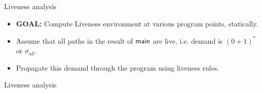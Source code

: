 \documentclass[xcolor=x11names,compress,mathserif]{beamer}
\renewcommand{\(}{\begin{columns}}
\renewcommand{\)}{\end{columns}}
\newcommand{\<}[1]{\begin{column}{#1}}
\renewcommand{\>}{\end{column}}
\begin{document}
\begin{frame}{Liveness analysis}
  \begin{itemize}
  \item {\bf  GOAL:} Compute  Liveness environment at  various program
    points, statically. 
  \item Assume that all paths in the result of ${\sf main}$ are live, i.e. demand is $(0 + 1)^*$ or $\sigma_{all}$.
  \item Propagate this demand through the program using liveness rules.
  \end{itemize}
\end{frame}
\begin{frame}{Liveness analysis}
  
\end{frame}














\end{document}
